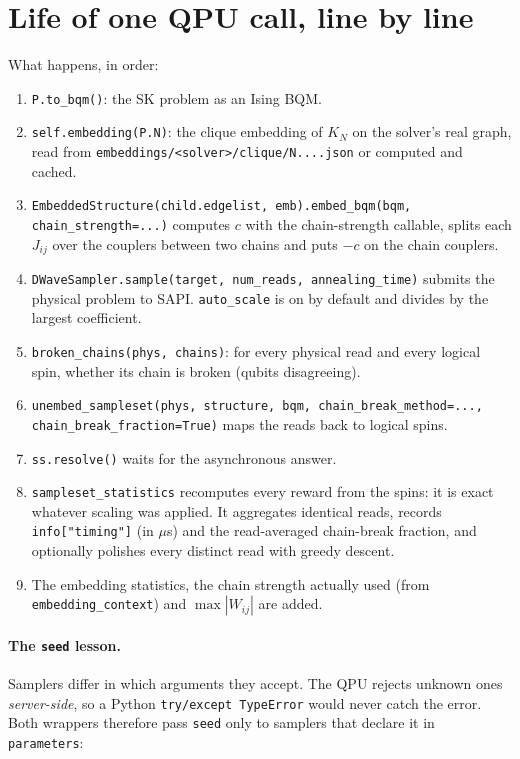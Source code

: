 \documentclass[11pt,a4paper]{article}
\newcommand{\code}[1]{\nolinkurl{#1}}
\newcommand{\src}[4]{}
\begin{document}
\section{Life of one QPU call, line by line}
\src{skgame/optim/backends.py}{\rSampleA}{\rSampleB}{\code{AnnealBackend.sample}: embed, sample, keep the physical reads, unembed}
What happens, in order:
\begin{enumerate}
\item \code{P.to_bqm()}: the SK problem as an Ising BQM.
\item \code{self.embedding(P.N)}: the clique embedding of $K_N$ on the solver's real graph, read from \code{embeddings/<solver>/clique/N....json} or computed and cached.
\item \code{EmbeddedStructure(child.edgelist, emb).embed_bqm(bqm, chain_strength=...)} computes $c$ with the chain-strength callable, splits each $J_{ij}$ over the couplers between two chains and puts $-c$ on the chain couplers.
\item \code{DWaveSampler.sample(target, num_reads, annealing_time)} submits the physical problem to SAPI. \code{auto_scale} is on by default and divides by the largest coefficient.
\item \code{broken_chains(phys, chains)}: for every physical read and every logical spin, whether its chain is broken (qubits disagreeing).
\item \code{unembed_sampleset(phys, structure, bqm, chain_break_method=..., chain_break_fraction=True)} maps the reads back to logical spins.
\item \code{ss.resolve()} waits for the asynchronous answer.
\item \code{sampleset_statistics} recomputes every reward from the spins: it is exact whatever scaling was applied. It aggregates identical reads, records \code{info["timing"]} (in $\mu$s) and the read-averaged chain-break fraction, and optionally polishes every distinct read with greedy descent.
\item The embedding statistics, the chain strength actually used (from \code{embedding_context}) and $\max|W_{ij}|$ are added.
\end{enumerate}
\src{skgame/optim/backends.py}{\rStatsA}{\rStatsB}{statistics of a sample set, including the broken chains of every read}

\paragraph{The \code{seed} lesson.} Samplers differ in which arguments they accept. The QPU rejects unknown ones
\emph{server-side}, so a Python \code{try/except TypeError} would never catch the error. Both wrappers therefore
pass \code{seed} only to samplers that declare it in \code{parameters}:
\src{skgame/optim/solvers.py}{\rSeedA}{\rSeedB}{passing \code{seed} only where it is accepted}
\end{document}
